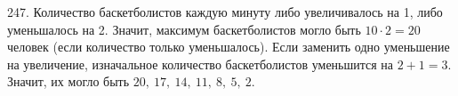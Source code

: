 247. Количество баскетболистов каждую минуту либо увеличивалось на 1, либо уменьшалось на 2. Значит, максимум баскетболистов могло быть $10\cdot2=20$ человек (если количество только уменьшалось). Если заменить одно уменьшение на увеличение, изначальное количество баскетболистов уменьшится на $2+1=3.$ Значит, их могло быть $20,\ 17,\ 14,\ 11,\ 8,\ 5,\ 2.$\\

